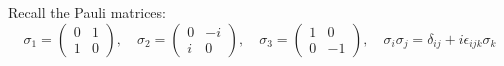 \documentclass{jknotes} %
\begin{document}
Recall the Pauli matrices:
\begin{equation}
    \sigma_1 = 
    \begin{pmatrix}
        0 & 1 \\
        1 & 0
    \end{pmatrix},\quad
    \sigma_2 = 
    \begin{pmatrix}
        0 & -i \\
        i & 0
    \end{pmatrix},\quad
    \sigma_3 =
    \begin{pmatrix}
        1 & 0 \\
        0 & -1
    \end{pmatrix},\quad
    \sigma_i\sigma_j=\delta_{ij}+i\epsilon_{ijk}\sigma_k
\end{equation}
\end{document}
